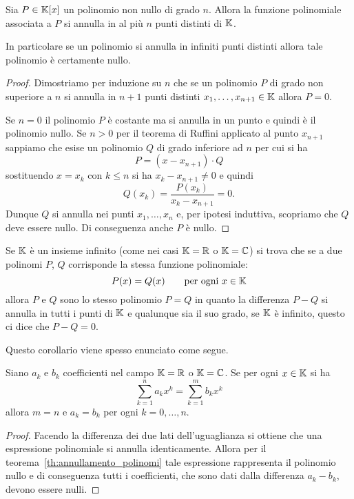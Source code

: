   \begin{theorem}
  \label{th:annullamento_polinomi}%
  Sia $P\in {\mathbb K}[x]$ un polinomio non nullo di grado $n$.
  Allora la funzione polinomiale associata a $P$
  si annulla in al più $n$ punti distinti di ${\mathbb K}$.
  
  In particolare se un polinomio si annulla in infiniti
  punti distinti allora tale polinomio è certamente nullo.
  \end{theorem}
  \begin{proof}
  Dimostriamo per induzione su $n$ che se un polinomio
  $P$ di grado non superiore a $n$ si annulla in $n+1$
  punti distinti $x_1, \dots, x_{n+1}\in {\mathbb K}$ allora
  $P=0$.
  
  Se $n=0$ il polinomio $P$ è costante ma si annulla
  in un punto e quindi è il polinomio nullo.
  Se $n>0$ per il teorema di Ruffini applicato al
  punto $x_{n+1}$ sappiamo che esise un polinomio $Q$
  di grado inferiore ad $n$ per cui si ha
  \[
    P = (x-x_{n+1}) \cdot Q
  \]
  sostituendo $x=x_k$ con $k\le n$ si ha $x_k-x_{n+1}\neq 0$
  e quindi
  \[
    Q(x_k) = \frac{P(x_k)}{x_k-x_{n+1}} = 0.
  \]
  Dunque $Q$ si annulla nei punti $x_1, \dots, x_n$
  e, per ipotesi induttiva, scopriamo che $Q$ deve
  essere nullo. Di conseguenza anche $P$ è nullo.
  \end{proof}
  
  Se ${\mathbb K}$ è un insieme infinito (come nei casi ${\mathbb K}={\mathbb R}$ o ${\mathbb K}={\mathbb C}$)
  si trova che
  se a due polinomi $P$, $Q$ corrisponde
  la stessa funzione polinomiale:
  \[
    P(x) = Q(x) \qquad \text{per ogni $x\in {\mathbb K}$}
  \]
  allora $P$ e $Q$ sono lo stesso polinomio $P=Q$
  in quanto la differenza $P-Q$ si annulla in tutti i punti
  di ${\mathbb K}$ e qualunque sia il suo grado, se ${\mathbb K}$ è infinito,
  questo ci dice che $P-Q=0$. 
  
  Questo corollario viene spesso enunciato come segue.
  \begin{theorem}
    Siano $a_k$ e $b_k$ coefficienti nel campo ${\mathbb K}={\mathbb R}$ o ${\mathbb K}={\mathbb C}$.
    Se per ogni $x\in {\mathbb K}$ si ha 
    \[
       \sum_{k=1}^n a_k x^k = \sum_{k=1}^m b_k x^k
    \]
    allora $m=n$ e $a_k=b_k$ per ogni $k=0, \dots, n$.
  \end{theorem}
  \begin{proof}
  Facendo la differenza dei due lati dell'uguaglianza si ottiene 
  che una espressione polinomiale si annulla identicamente. 
  Allora per il teorema~\ref{th:annullamento_polinomi} tale espressione 
  rappresenta il polinomio nullo e di conseguenza tutti i coefficienti, 
  che sono dati dalla differenza $a_k-b_k$, devono essere nulli.
  \end{proof}
  


